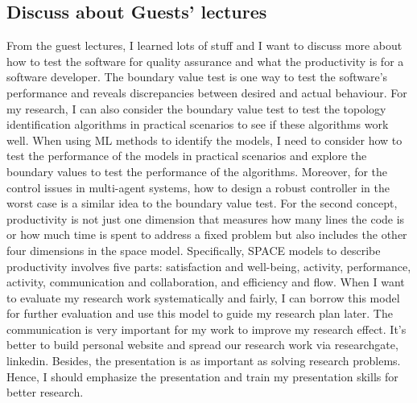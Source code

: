 \documentclass[11pt]{article}
\begin{document}
\subsection*{Discuss about Guests' lectures}
From the guest lectures, I learned lots of stuff and I want to discuss more about how to test the software for quality assurance and what the productivity is for a software developer. The boundary value test is one way to test the software’s performance and reveals discrepancies between desired and actual behaviour. For my research, I can also consider the boundary value test to test the topology identification algorithms in practical scenarios to see if these algorithms work well. When using ML methods to identify the models, I need to consider how to test the performance of the models in practical scenarios and explore the boundary values to test the performance of the algorithms. Moreover, for the control issues in multi-agent systems, how to design a robust controller in the worst case is a similar idea to the boundary value test. For the second concept, productivity is not just one dimension that measures how many lines the code is or how much time is spent to address a fixed problem but also includes the other four dimensions in the space model. Specifically, SPACE models to describe productivity involves five parts:  satisfaction and well-being, activity, performance, activity, communication and collaboration, and efficiency and flow. When I want to evaluate my research work systematically and fairly, I can borrow this model for further evaluation and use this model to guide my research plan later. The communication is very important for my work to improve my research effect. It's better to build personal website and spread our research work via researchgate, linkedin.  Besides, the presentation is as important as solving research problems. Hence, I should emphasize the presentation and train my presentation skills for better research.
\\
\end{document}

